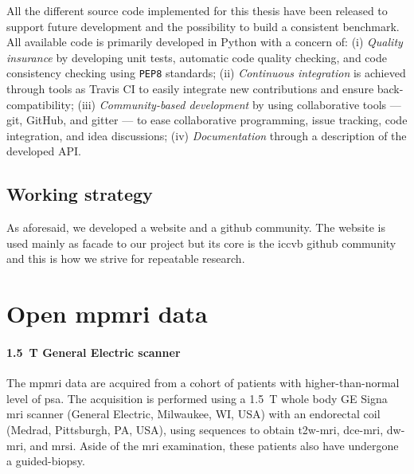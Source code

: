 All the different source code implemented for this thesis have been released to support future development and the possibility to build a consistent benchmark.
All available code is primarily developed in Python with a concern of:
(i) \emph{Quality insurance} by developing unit tests, automatic code quality checking, and code consistency checking using \texttt{PEP8} standards;
(ii) \emph{Continuous integration} is achieved through tools as Travis CI to easily integrate new contributions and ensure back-compatibility;
(iii) \emph{Community-based development} by using collaborative tools --- git, GitHub, and gitter --- to ease collaborative programming, issue tracking, code integration, and idea discussions;
(iv) \emph{Documentation} through a description of the developed API.

\subsection{Working strategy}
As aforesaid, we developed a website and a github community. The website is used
mainly as facade to our project but its core is the \acs{iccvb} github community
and this is how we strive for repeatable research. 

\section{Open \acs*{mpmri} data}

\paragraph{\SI{1.5}{\tesla} General Electric scanner}

The \ac{mpmri} data are acquired from a cohort of patients with higher-than-normal level of \ac{psa}.
The acquisition is performed using a \SI{1.5}{\tesla} whole body GE Signa \ac{mri} scanner (General Electric, Milwaukee, WI, USA) with an endorectal coil (Medrad, Pittsburgh, PA, USA), using sequences to obtain \ac{t2w}-\ac{mri}, \ac{dce}-\ac{mri}, \ac{dw}-\ac{mri}, and \ac{mrsi}.
Aside of the \ac{mri} examination, these patients also have undergone a guided-biopsy.

